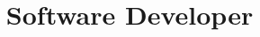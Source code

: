 \documentclass[10pt,a4paper,sans]{moderncv}
\title{Software Developer}
\begin{document}
    \makecvtitle

    
    
    

    \clearpage
\end{document}
